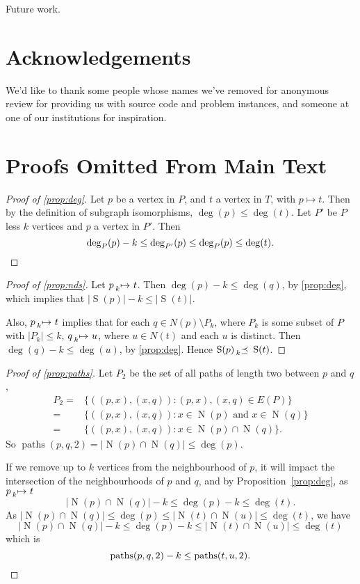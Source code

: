 \documentclass[letterpaper]{article}
\theoremstyle{definition}
\newcommand{\paths}{\operatorname{paths}}
\newcommand{\lessmap}[1]{\prescript{}{#1}{\mapsto}\ }
\newcommand{\lesspreceq}[1]{\prescript{}{#1}{\preceq}\ }
\newcommand{\N}{\operatorname{N}}
\newcommand{\nds}{\operatorname{S}}
\begin{document}
Future work.

\section*{Acknowledgements}

We'd like to thank some people whose names we've removed for anonymous review for providing us with
source code and problem instances, and someone at one of our institutions for inspiration.




\clearpage
\appendix

\section{Proofs Omitted From Main Text}

\begin{proof}[Proof of \cref{prop:deg}]
Let $p$ be a vertex in $P$, and $t$ a vertex in $T$, with $p\mapsto t$. Then by the definition of subgraph isomorphisms, $\deg(p) \le \deg(t)$. Let $P'$ be $P$ less $k$ vertices and $p$ a vertex in $P'$. Then
\[
\deg_{P}(p)-k \le \deg_{P'}(p) \le \deg_{P}(p) \le \deg(t). \qedhere
\]
\end{proof}

\begin{proof}[Proof of \cref{prop:nds}]
Let $p \lessmap{k} t$.  Then $\deg(p) - k \leq \deg(q)$, by \cref{prop:deg}, which
implies that $\left|\nds(p)\right| -k \leq \left| \nds(t) \right| $.

Also, $p \lessmap{k} t$ implies that for each $q \in N(p) \setminus P_k$, where $P_k$
is some subset of $P$ with $\left| P_k \right| \leq k$, $q \lessmap{k} u$, where $u \in N(t)$ and
each $u$ is distinct.  Then $\deg(q) - k \leq \deg(u)$, by \cref{prop:deg}.  Hence $\nds(p)
\lesspreceq{k} \nds(t)$.
\end{proof}

\begin{proof}[Proof of \cref{prop:paths}]
Let $P_{2}$ be the set of all paths of length two between $p$ and $q$,
\begin{align*}
P_{2} = & \{((p,x),(x,q)) : (p,x),(x,q)\in E(P) \} \\
 = & \{((p,x),(x,q)) : x\in \N(p) \text{ and } x\in \N(q) \} \\
 = & \{((p,x),(x,q)) : x\in \N(p)\cap \N(q) \} .
\end{align*}
So $\paths(p,q,2) = \left| \N(p)\cap \N(q) \right|  \leq \deg(p)$.

If we remove up to $k$ vertices from the neighbourhood of $p$, it will impact the intersection of the neighbourhoods of $p$ and $q$, and by Proposition~\ref{prop:deg}, as $p\lessmap{k}t$
\[
\left| \N(p)\cap \N(q)\right| - k \leq \deg(p) - k \leq \deg(t).
\]
As $\left|\N(p)\cap \N(q)\right|\leq \deg(p) \leq \left|\N(t)\cap \N(u)\right|\leq \deg(t)$, we have
\[
\left|\N(p)\cap \N(q)\right| - k \leq \deg(p) - k\leq \left|\N(t)\cap \N(u)\right|\leq \deg(t)
\]
which is
\[
\paths(p, q, 2) - k \leq \paths(t, u, 2). \qedhere
\]
\end{proof}
\end{document}
